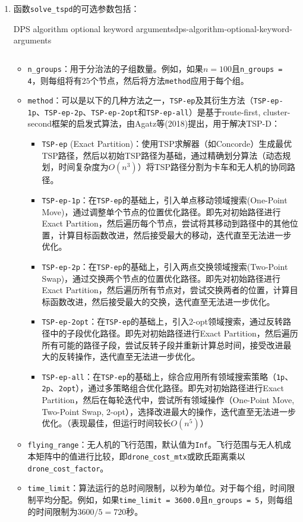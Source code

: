 \begin{enumerate}
    \item 函数\texttt{solve_tspd}的可选参数包括：

\begin{code}{DPS algorithm optional keyword arguments}{dps-algorithm-optional-keyword-arguments}
    \inputminted{julia}{code/DPS-usage-examples/dps-optional-keyword-arguments.jl}
\end{code}
    \begin{itemize}
        \item \texttt{n\_groups}：用于分治法的子组数量。例如，如果$n = 100$且\texttt{n\_groups = 4}，则每组将有$25$个节点，然后将方法\texttt{method}应用于每个组。
        \item \texttt{method}：可以是以下的几种方法之一，\texttt{TSP-ep}及其衍生方法（\texttt{TSP-ep-1p}、\texttt{TSP-ep-2p}、\texttt{TSP-ep-2opt}和\texttt{TSP-ep-all}）是基于route-first, cluster-second框架的启发式算法，由Agatz等(2018)\cite{agatzOptimizationApproachesTraveling2018}提出，用于解决TSP-D：
        \begin{itemize}
            \item \texttt{TSP-ep} (Exact Partition)：使用TSP求解器（如Concorde）生成最优TSP路径，然后以初始TSP路径为基础，通过精确划分算法（动态规划，时间复杂度为$O(n^3)$）将TSP路径分割为卡车和无人机的协同路径。
            \item \texttt{TSP-ep-1p}：在\texttt{TSP-ep}的基础上，引入单点移动领域搜索(One-Point Move)，通过调整单个节点的位置优化路径。即先对初始路径进行Exact Partition，然后遍历每个节点，尝试将其移动到路径中的其他位置，计算目标函数改进，然后接受最大的移动，迭代直至无法进一步优化。
            \item \texttt{TSP-ep-2p}：在\texttt{TSP-ep}的基础上，引入两点交换领域搜索(Two-Point Swap)，通过交换两个节点的位置优化路径。即先对初始路径进行Exact Partition，然后遍历所有节点对，尝试交换两者的位置，计算目标函数改进，然后接受最大的交换，迭代直至无法进一步优化。
            \item \texttt{TSP-ep-2opt}：在\texttt{TSP-ep}的基础上，引入2-opt领域搜索，通过反转路径中的子段优化路径。即先对初始路径进行Exact Partition，然后遍历所有可能的路径子段，尝试反转子段并重新计算总时间，接受改进最大的反转操作，迭代直至无法进一步优化。
            \item \texttt{TSP-ep-all}：在\texttt{TSP-ep}的基础上，综合应用所有领域搜索策略（\texttt{1p}、\texttt{2p}、\texttt{2opt}），通过多策略组合优化路径。即先对初始路径进行Exact Partition，然后在每轮迭代中，尝试所有领域操作（One-Point Move, Two-Point Swap, 2-opt），选择改进最大的操作，迭代直至无法进一步优化。（表现最佳，但运行时间较长$O(n^5)$）
        \end{itemize}
        \item \texttt{flying\_range}：无人机的飞行范围，默认值为\texttt{Inf}。飞行范围与无人机成本矩阵中的值进行比较，即\texttt{drone\_cost\_mtx}或欧氏距离乘以\texttt{drone\_cost\_factor}。
        \item \texttt{time\_limit}：算法运行的总时间限制，以秒为单位。对于每个组，时间限制平均分配。例如，如果\texttt{time\_limit = 3600.0}且\texttt{n\_groups = 5}，则每组的时间限制为$3600/5=720$秒。
    \end{itemize}
\end{enumerate}

